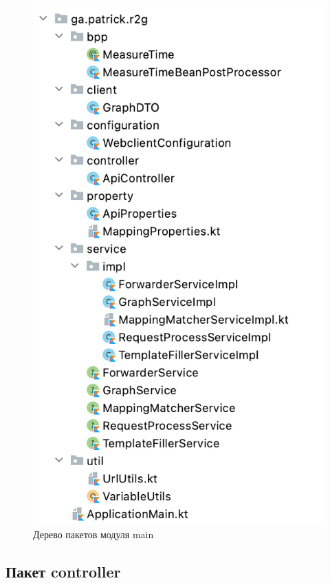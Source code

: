 \begin{figure}[ht!]
	\center
	\includegraphics [scale=0.6] {my_folder/images/ch3-classes}
	\caption{Дерево пакетов модуля main}
	\label{fig:ch3-classes}
\end{figure}

\subsection{Пакет controller}\label{subsec:package-controller}

